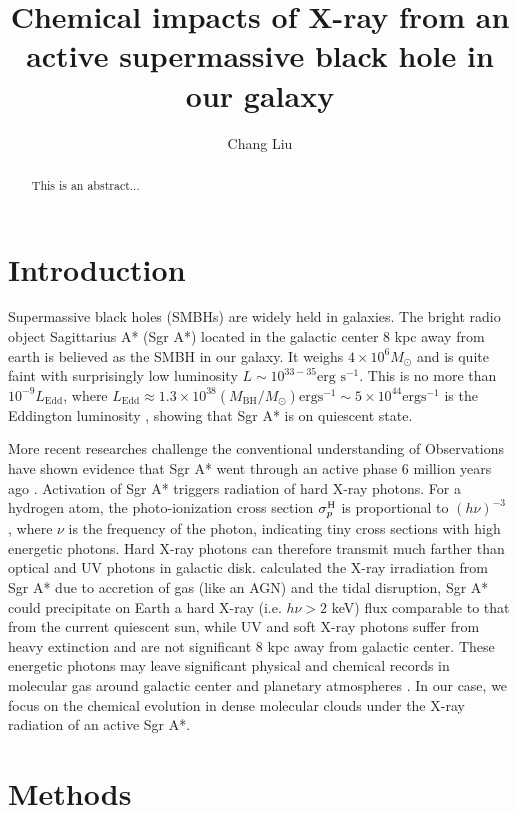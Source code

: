 \documentclass[twocolumn]{aastex62}
\begin{document}
	\title{Chemical impacts of X-ray from an active supermassive black hole in our galaxy}
	\author{Chang Liu}
	\begin{abstract}
		This is an abstract...
	\end{abstract}
	\section{Introduction}
	
	Supermassive black holes (SMBHs) are widely held in galaxies. The bright radio object Sagittarius A* (Sgr A*) located in the galactic center 8 kpc away from earth is believed as the SMBH in our galaxy. It weighs 
	$4\times10^{6}M_\odot$ and is quite faint with surprisingly low luminosity $L\sim10^{33-35}\text{erg s}^{-1}$. This is no more 
	than $10^{-9}L_{\text{Edd}}$, where $L_{\mathrm{Edd}} \approx 1.3 \times 10^{38}\left(M_{\mathrm{BH}} / M_{\odot}\right) \text{erg} 
	\mathrm{s}^{-1}\sim 5\times10^{44} \text{erg} \mathrm{s}^{-1}$ is the Eddington luminosity \citep{Sabha2010}, showing that Sgr A* is on quiescent state. 
	
	More recent researches challenge the conventional understanding of Observations have shown evidence that Sgr A* went through an active phase 6 million years ago \citep{Nicastro2016}. Activation of Sgr A* triggers radiation of hard X-ray photons. For a hydrogen atom, the photo-ionization cross section $\sigma_p^{\ce{H}}$ is proportional to $(h\nu)^{-3}$ \citep{Brown1970}, where $\nu$ is the frequency of the photon, indicating tiny cross sections with high energetic photons. Hard X-ray photons can therefore transmit much farther than optical and UV photons in galactic disk. \cite{Amaro-Seoane2014} calculated the X-ray irradiation from Sgr A* due to accretion of gas (like an AGN) and the tidal disruption, Sgr A* could precipitate on Earth a hard X-ray (i.e. $h\nu > 2$ keV) flux comparable to that from the current quiescent sun, while UV and soft X-ray photons suffer from heavy extinction and are not significant 8 kpc away from galactic center. These energetic photons may leave significant physical and chemical records in molecular gas around galactic center \citep{Krolik1983, Neufeld1994, Aalto2014} and planetary atmospheres \citep{Loeb2018,Wis2019}.
	In our case, we focus on the chemical evolution in dense molecular clouds under the X-ray radiation of an active Sgr A*. 
	\section{Methods}
\end{document}
